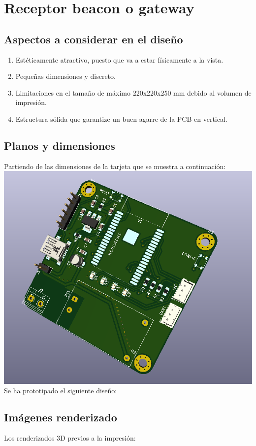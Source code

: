 \documentclass[a4paper ,12pt, onecolumn]{article}
\begin{document}
\section{Receptor beacon o gateway}
    \subsection{Aspectos a considerar en el diseño}
        \begin{enumerate}
            \item Estéticamente atractivo, puesto que va a estar físicamente a la vista.
            \item Pequeñas dimensiones y discreto.
            \item Limitaciones en el tamaño de máximo 220x220x250 mm debido al volumen de impresión.
            \item Estructura sólida que garantize un buen agarre de la PCB en vertical.
        \end{enumerate}
    \subsection{Planos y dimensiones}
        Partiendo de las dimensiones de la tarjeta que se muestra a continuación:
        \includegraphics[scale=0.2]{../receiver_1.PNG}
        Se ha prototipado el siguiente diseño:
    \subsection{Imágenes renderizado}
        Los renderizados 3D previos a la impresión:
        
\end{document}
